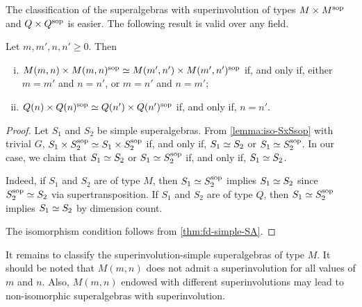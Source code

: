 The classification of the superalgebras with superinvolution of types $M\times M^{\mathrm{sop}}$ and $Q\times Q^{\mathrm{sop}}$ is easier. 
The following result is valid over any field.

\begin{prop}\label{prop:classify-MxM-QxQ}
    Let $m,m',n,n' \geq 0$. %
    Then 
    \begin{enumerate}[(i)]
        \item $M(m,n) \times M(m,n)^{\mathrm{sop}} \simeq M(m',n') \times M(m',n')^{\mathrm{sop}}$ if, and only if, either $m = m'$ and $n = n'$, or $m = n'$ and $n = m'$; 
        \item $Q(n) \times Q(n)^{\mathrm{sop}} \simeq Q(n') \times Q(n')^{\mathrm{sop}}$ if, and only if, $n = n'$.
    \end{enumerate}
\end{prop}

\begin{proof}
    Let $S_1$ and $S_2$ be simple superalgebras. 
    From \cref{lemma:iso-SxSsop} with trivial $G$, $S_1\times S_2^{\mathrm{sop}} \simeq S_1\times S_2^{\mathrm{sop}}$ if, and only if, $S_1 \simeq S_2$ or $S_1 \simeq S_2^{\mathrm{sop}}$. 
    In our case, we claim that  $S_1 \simeq S_2$ or $S_1 \simeq S_2^{\mathrm{sop}}$ if, and only if, $S_1 \simeq S_2$. 
    
    Indeed, if $S_1$ and $S_2$ are of type $M$, then $S_1 \simeq S_2^{\mathrm{sop}}$ implies $S_1 \simeq S_2$ since $S_2^{\mathrm{sop}} \simeq S_2$ via supertransposition. 
    If $S_1$ and $S_2$ are of type $Q$, then $S_1 \simeq S_2^{\mathrm{sop}}$ implies $S_1 \simeq S_2$ by dimension count. 
    
    The isomorphism condition follows from \cref{thm:fd-simple-SA}.
\end{proof}

It remains to classify the superinvolution-simple superalgebras of type $M$. 
It should be noted that $M(m,n)$ does not admit a superinvolution for all values of $m$ and $n$. 
Also, $M(m,n)$ endowed with different superinvolutions may lead to non-isomorphic superalgebras with superinvolution. 

